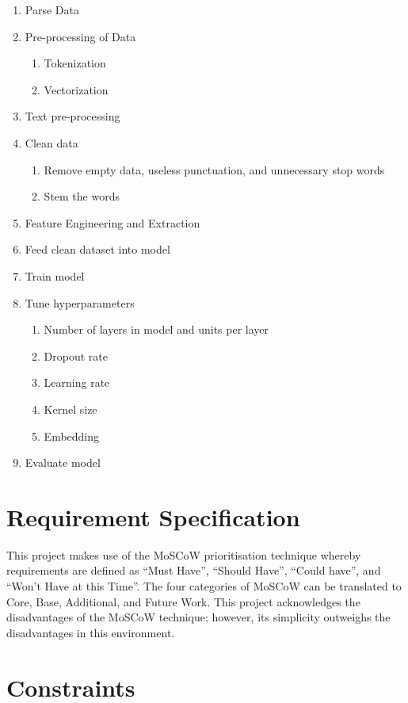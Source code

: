 \begin{enumerate}
    \item Parse Data
    \item Pre-processing of Data
    \begin{enumerate}
        \item Tokenization
        \item Vectorization
    \end{enumerate}
\item Text pre-processing
\item Clean data
    \begin{enumerate}
        \item Remove empty data, useless punctuation, and unnecessary stop words
        \item Stem the words
    \end{enumerate}
\item Feature Engineering and Extraction
\item Feed clean dataset into model
\item Train model
\item Tune hyperparameters
    \begin{enumerate}
        \item Number of layers in model and units per layer
        \item Dropout rate
        \item Learning rate
        \item Kernel size
        \item Embedding
    \end{enumerate}
\item Evaluate model
\end{enumerate}

\section{Requirement Specification}

This project makes use of the MoSCoW prioritisation technique whereby requirements are defined as “Must Have”, “Should Have”, “Could have”, and “Won’t Have at this Time”. The four categories of MoSCoW can be translated to Core, Base, Additional, and Future Work. This project acknowledges the disadvantages of the MoSCoW technique; however, its simplicity outweighs the disadvantages in this environment.

\section{Constraints}

